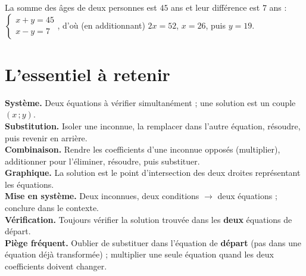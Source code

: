 \begin{illus}
\end{illus}

\begin{exemple}
La somme des âges de deux personnes est $45$ ans et leur différence est $7$ ans :
$\left\{\begin{array}{l}x+y=45\\x-y=7\end{array}\right.$, d'où (en additionnant) $2x=52$,
$x=26$, puis $y=19$.
\end{exemple}

\section{L'essentiel à retenir}

\begin{synthese}
\textbf{Système.} Deux équations à vérifier simultanément ; une solution est un couple
$(x\,;y)$.\\[4pt]
\textbf{Substitution.} Isoler une inconnue, la remplacer dans l'autre équation, résoudre,
puis revenir en arrière.\\[4pt]
\textbf{Combinaison.} Rendre les coefficients d'une inconnue opposés (multiplier), additionner
pour l'éliminer, résoudre, puis substituer.\\[4pt]
\textbf{Graphique.} La solution est le point d'intersection des deux droites représentant
les équations.\\[4pt]
\textbf{Mise en système.} Deux inconnues, deux conditions $\to$ deux équations ; conclure
dans le contexte.\\[4pt]
\textbf{Vérification.} Toujours vérifier la solution trouvée dans les \textbf{deux}
équations de départ.\\[4pt]
\textbf{Piège fréquent.} Oublier de substituer dans l'équation de \textbf{départ} (pas dans
une équation déjà transformée) ; multiplier une seule équation quand les deux coefficients
doivent changer.
\end{synthese}

